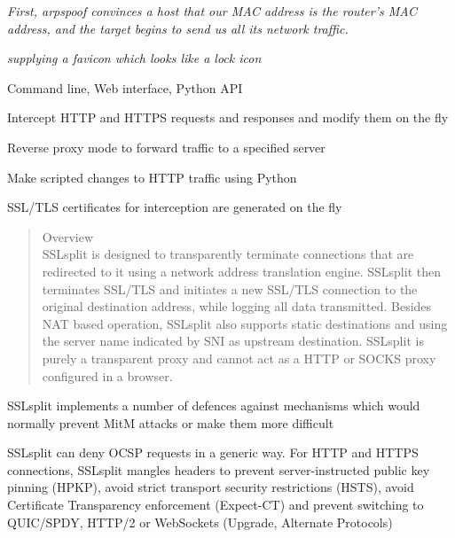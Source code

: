 \documentclass[Screen16to9,17pt]{foils}
\begin{document}
\begin{list2}
\item \emph{First, arpspoof convinces a host that our MAC address is the router’s MAC address, and the target begins to send us all its network traffic.}
\item \emph{supplying a favicon which looks like a lock icon}
\end{list2}




\begin{list2}
\item Command line, Web interface, Python API
\item Intercept HTTP and HTTPS requests and responses and modify them on the fly
\item Reverse proxy mode to forward traffic to a specified server
\item Make scripted changes to HTTP traffic using Python
\item SSL/TLS certificates for interception are generated on the fly
\end{list2}


\begin{quote}\small
Overview\\
SSLsplit is designed to transparently terminate connections that are redirected to it using a network address translation engine. SSLsplit then terminates SSL/TLS and initiates a new SSL/TLS connection to the original destination address, while logging all data transmitted. Besides NAT based operation, SSLsplit also supports static destinations and using the server name indicated by SNI as upstream destination. SSLsplit is purely a transparent proxy and cannot act as a HTTP or SOCKS proxy configured in a browser.
\end{quote}


\begin{list2}
\item SSLsplit implements a number of defences against mechanisms which would normally prevent MitM attacks or make them more difficult
\item {\small SSLsplit can deny OCSP requests in a generic way. For HTTP and HTTPS connections, SSLsplit mangles headers to prevent server-instructed public key pinning (HPKP), avoid strict transport security restrictions (HSTS), avoid Certificate Transparency enforcement (Expect-CT) and prevent switching to QUIC/SPDY, HTTP/2 or WebSockets (Upgrade, Alternate Protocols)}
\end{list2}
\end{document}
